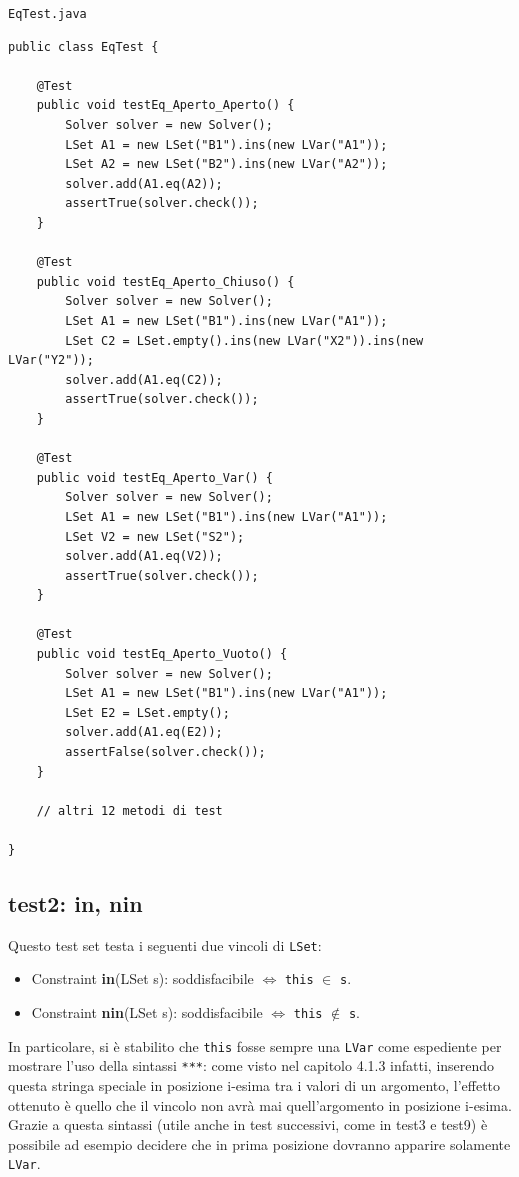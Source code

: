\vspace{10 mm}

\texttt{EqTest.java}
\begin{lstlisting}
public class EqTest {
	
	@Test
	public void testEq_Aperto_Aperto() {
		Solver solver = new Solver();
		LSet A1 = new LSet("B1").ins(new LVar("A1"));
		LSet A2 = new LSet("B2").ins(new LVar("A2"));
		solver.add(A1.eq(A2));
		assertTrue(solver.check());
	}

	@Test
	public void testEq_Aperto_Chiuso() {
		Solver solver = new Solver();
		LSet A1 = new LSet("B1").ins(new LVar("A1"));
		LSet C2 = LSet.empty().ins(new LVar("X2")).ins(new LVar("Y2"));
		solver.add(A1.eq(C2));
		assertTrue(solver.check());
	}

	@Test
	public void testEq_Aperto_Var() {
		Solver solver = new Solver();
		LSet A1 = new LSet("B1").ins(new LVar("A1"));
		LSet V2 = new LSet("S2");
		solver.add(A1.eq(V2));
		assertTrue(solver.check());
	}

	@Test
	public void testEq_Aperto_Vuoto() {
		Solver solver = new Solver();
		LSet A1 = new LSet("B1").ins(new LVar("A1"));
		LSet E2 = LSet.empty();
		solver.add(A1.eq(E2));
		assertFalse(solver.check());
	}
	
	// altri 12 metodi di test

}
\end{lstlisting}

\subsection{test2: in, nin}
Questo test set testa i seguenti due vincoli di \texttt{LSet}:\\
\begin{itemize}
\item Constraint \textbf{in}(LSet s): soddisfacibile $\iff$ \texttt{this} $\in$ \texttt{s}.
\item Constraint \textbf{nin}(LSet s): soddisfacibile $\iff$ \texttt{this} $\notin$ \texttt{s}.
\end{itemize}

In particolare, si è stabilito che \texttt{this} fosse sempre una \texttt{LVar} come espediente per mostrare l'uso della sintassi \texttt{***}: come visto nel capitolo 4.1.3 infatti, inserendo questa stringa speciale in posizione i-esima tra i valori di un argomento, l'effetto ottenuto è quello che il vincolo non avrà mai quell'argomento in posizione i-esima.\\
Grazie a questa sintassi (utile anche in test successivi, come in test3 e test9) è possibile ad esempio decidere che in prima posizione dovranno apparire solamente \texttt{LVar}.\\\\

